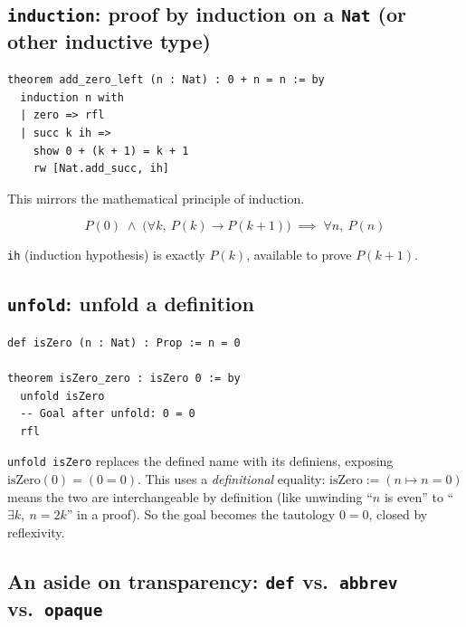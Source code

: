 \subsection{\texorpdfstring{\texttt{induction}: proof by induction on a \texttt{Nat} (or other inductive type)}{induction: proof by induction on a Nat (or other inductive type)}}\label{sec:04-tactics:04-more-tactics:5}

\begin{lstlisting}
theorem add_zero_left (n : Nat) : 0 + n = n := by
  induction n with
  | zero => rfl
  | succ k ih =>
    show 0 + (k + 1) = k + 1
    rw [Nat.add_succ, ih]
\end{lstlisting}

This mirrors the mathematical principle of induction.

\[
P(0) \;\land\; \big(\forall k,\ P(k) \to P(k+1)\big) \;\implies\; \forall n,\ P(n)
\]

\texttt{ih} (induction hypothesis) is exactly \(P(k)\), available to prove \(P(k+1)\).

\subsection{\texorpdfstring{\texttt{unfold}: unfold a definition}{unfold: unfold a definition}}\label{sec:04-tactics:04-more-tactics:6}

\begin{lstlisting}
def isZero (n : Nat) : Prop := n = 0

theorem isZero_zero : isZero 0 := by
  unfold isZero
  -- Goal after unfold: 0 = 0
  rfl
\end{lstlisting}

\begin{mathreading}

\texttt{unfold isZero} replaces the defined name with its definiens, exposing \(\mathrm{isZero}(0) = (0 = 0)\). This uses a \emph{definitional} equality: \(\mathrm{isZero} := (n \mapsto n = 0)\) means the two are interchangeable by definition (like unwinding ``\(n\) is even'' to ``\(\exists k,\ n = 2k\)'' in a proof). So the goal becomes the tautology \(0 = 0\), closed by reflexivity.

\end{mathreading}

\subsection{\texorpdfstring{An aside on transparency: \texttt{def} vs.~\texttt{abbrev} vs.~\texttt{opaque}}{An aside on transparency: def vs.~abbrev vs.~opaque}}\label{sec:04-tactics:04-more-tactics:7}

